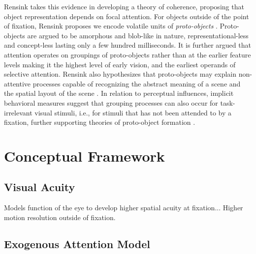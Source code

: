 \documentclass[a4paper,10pt,final]{ThesisStyle}
\begin{document}
Rensink takes this evidence in developing a theory of coherence, proposing that object representation depends on focal attention.  For objects outside of the point of fixation, Rensink proposes we encode volatile units of \textit{proto-objects} \cite{Rensink2000,Rensink2001}.  Proto-objects are argued to be amorphous and blob-like in nature, representational-less and concept-less lasting only a few hundred milliseconds.  It is further argued that attention operates on groupings of proto-objects rather than at the earlier feature levels making it the highest level of early vision, and the earliest operands of selective attention.  Rensink also hypothesizes that proto-objects may explain non-attentive processes capable of recognizing the abstract meaning of a scene and the spatial layout of the scene \cite{Rensink2002}.  In relation to perceptual influences, implicit behavioral measures suggest that grouping processes can also occur for task-irrelevant visual stimuli, i.e., for stimuli that has not been attended to by a fixation, further supporting theories of proto-object formation \cite{Lamy2006}.


\section{Conceptual Framework}

\subsection{Visual Acuity}

Models function of the eye to develop higher spatial acuity at fixation... Higher motion resolution outside of fixation.

\subsection{Exogenous Attention Model}
\end{document}
